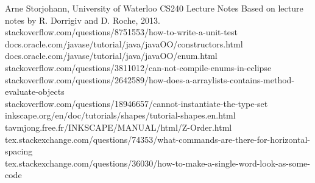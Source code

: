 \documentclass[letterpaper,10pt]{article}
\begin{document}
\begin{thebibliography}{99}
Arne Storjohann, University of Waterloo CS240 Lecture Notes Based on lecture notes by R. Dorrigiv and D. Roche, 2013.
stackoverflow.com/questions/8751553/how-to-write-a-unit-test
docs.oracle.com/javase/tutorial/java/javaOO/constructors.html\\
docs.oracle.com/javase/tutorial/java/javaOO/enum.html\\
stackoverflow.com/questions/3811012/can-not-compile-enums-in-eclipse\\
stackoverflow.com/questions/2642589/how-does-a-arraylists-contains-method-evaluate-objects\\
stackoverflow.com/questions/18946657/cannot-instantiate-the-type-set
inkscape.org/en/doc/tutorials/shapes/tutorial-shapes.en.html\\
tavmjong.free.fr/INKSCAPE/MANUAL/html/Z-Order.html
tex.stackexchange.com/questions/74353/what-commands-are-there-for-horizontal-spacing\\
tex.stackexchange.com/questions/36030/how-to-make-a-single-word-look-as-some-code


\end{thebibliography}
\end{document}
